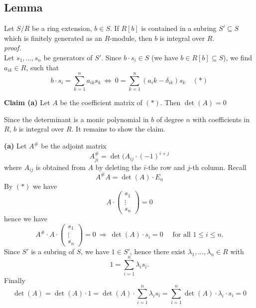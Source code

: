 \documentclass[12pt]{book}
\begin{document}
\begin{spacing}{1.3}
\subsection{Lemma} %
Let $S/R$ be a ring extension, $b \in S$. If $R[b]$ is contained in a subring $S' \subseteq S$ which is finitely generated as an $R$-module, then $b$ is integral over $R$.\\
\textit{proof.}\\
Let $s_1, \ldots, s_n$ be generators of $S'$. Since $b \cdot s_i \in S$ (we have $b \in R[b] \subseteq S$), we find $a_{ik} \in R$, such that 
$$b\cdot s_i = \sum_{k=1}^n a_{ik} s_k \ \Longleftrightarrow \ 0=\sum_{k=1}^n (a_ik-\delta_{ik})s_k \quad (*)$$
\begin{compactenum}
\item[\textbf{Claim (a)}] Let $A$ be the coefficient matrix of $(*)$. Then $\det(A)=0$
\end{compactenum}
Since the determinant is a monic polynomial in $b$ of degree $n$ with coefficients in $R$, $b$ is integral over $R$. It remains to show the claim.
\begin{compactenum}
\item[\textbf{(a)}] Let $A^{\#}$ be the adjoint matrix
$$A_{ji}^{\#}=\det(A_{ij} \cdot (-1)^{i+j}$$
where $A_{ij}$ is obtained from $A$ by deleting the $i$-the row and $j$-th column. Recall
$$A^{\#} A = \det(A) \cdot E_n$$
By $(*)$ we have
$$A \cdot \begin{pmatrix}s_1 \\ \vdots \\ s_n \end{pmatrix} =0$$
hence we have
$$A^{\#}\cdot A \cdot \begin{pmatrix}s_1 \\ \vdots \\ s_n \end{pmatrix} =0 \ \Longrightarrow \ \det(A) \cdot s_i = 0 \quad \textrm{ for all } 1 \leqslant i \leqslant n.$$
Since $S'$ is a subring of $S$, we have $1\in S'$, hence there exist $\lambda_1, \ldots, \lambda_n \in R$ with
$$1 = \sum_{i=1}^n \lambda_i s_i.$$
Finally
$$\det(A)=\det(A) \cdot 1 = \det(A)\cdot \sum_{i=1}^n \lambda_i s_i = \sum_{i=1}^n \det(A) \cdot \lambda_i \cdot s_i = 0$$
\end{compactenum}


\end{spacing}
\end{document}

